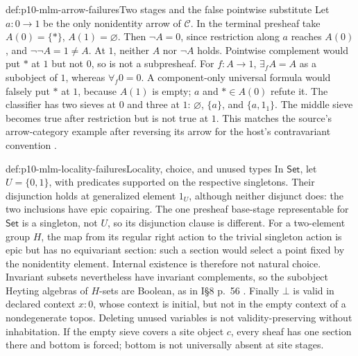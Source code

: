 \begin{hbexample}{def:p10-mlm-arrow-failures}{Two stages and the false pointwise substitute}
Let \(a:0\to1\) be the only nonidentity arrow of \(\mathcal C\).
In the terminal presheaf take \(A(0)=\{*\}\), \(A(1)=\varnothing\).
Then \(\neg A=0\), since restriction along \(a\) reaches \(A(0)\), and
\(\neg\neg A=1\neq A\). At \(1\), neither \(A\) nor \(\neg A\) holds.
Pointwise complement would put \(*\) at \(1\) but not \(0\), so is not a
subpresheaf. For \(f:A\to1\), \(\exists_f A=A\) as a subobject of \(1\),
whereas \(\forall_f0=0\). A component-only universal formula would falsely
put \(*\) at \(1\), because \(A(1)\) is empty; \(a\) and \(*\in A(0)\)
refute it. The classifier has two sieves at \(0\) and three at \(1\):
\(\varnothing\), \(\{a\}\), and \(\{a,1_1\}\). The middle sieve becomes
true after restriction but is not true at \(1\).
This matches the source's arrow-category example after reversing its arrow
for the host's contravariant convention \cite[I\S4, pp.~35--36; I\S8, p.~56]
{MacLaneMoerdijk1992}.
\end{hbexample}

\begin{hbexample}{def:p10-mlm-locality-failures}{Locality, choice, and unused types}
In \(\mathsf{Set}\), let \(U=\{0,1\}\), with predicates supported on the
respective singletons. Their disjunction holds at generalized element
\(1_U\), although neither disjunct does: the two inclusions have epic
copairing. The one presheaf base-stage representable for \(\mathsf{Set}\)
is a singleton, not \(U\), so its disjunction clause is different.
For a two-element group \(H\), the map from its regular right action to
the trivial singleton action is epic but has no equivariant section:
such a section would select a point fixed by the nonidentity element.
Internal existence is therefore not natural choice. Invariant subsets
nevertheless have invariant complements, so the subobject Heyting algebras
of \(H\)-sets are Boolean, as in I\S8 p.~56 \cite{MacLaneMoerdijk1992}.
Finally \(\bot\) is valid in declared context \(x:0\), whose context is
initial, but not in the empty context of a nondegenerate topos. Deleting
unused variables is not validity-preserving without inhabitation.
If the empty sieve covers a site object \(c\), every sheaf has one section
there and bottom is forced; bottom is not universally absent at site stages.
\end{hbexample}

